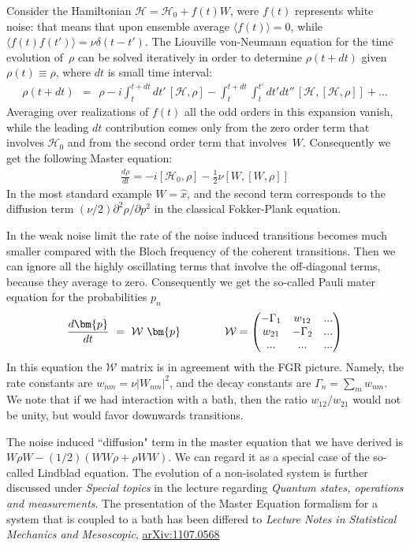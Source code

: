 \documentclass[onecolumn,fleqn]{revtex4}
\newcommand{\amatrix}[1]{\begin{matrix} #1 \end{matrix}}
\newcommand{\beq}{\begin{eqnarray}}
\newcommand{\eeq}{\end{eqnarray}}
\begin{document}
Consider the Hamiltonian ${\mathcal{H}=\mathcal{H}_0+f(t)W}$, 
were  $f(t)$ represents white noise: that means that upon 
ensemble average ${\langle f(t)\rangle=0}$, 
while ${\langle f(t)f(t') \rangle = \nu\delta(t-t')}$. 
The Liouville von-Neumann equation for the time evolution 
of~$\rho$ can be solved iteratively in order 
to determine $\rho(t+dt)$ given $\rho(t)\equiv\rho$, where $dt$ 
is small time interval:
\beq
\rho(t+dt) \ \ = \ \ \rho -i\int_t^{t+dt} dt' \, [\mathcal{H}, \rho] 
-\int_t^{t+dt} \int_t^{t'}  dt'dt''  \, [\mathcal{H}, [\mathcal{H}, \rho]] + ... 
\eeq
Averaging over realizations of $f(t)$ all the odd orders in this expansion 
vanish, while the leading $dt$ contribution comes only from the 
zero order term that involves $\mathcal{H}_0$ 
and from the second order term that involves~$W$.
Consequently we get the following Master equation:
\beq 
\frac{d\rho}{dt} = -i[\mathcal{H}_0,\rho] - \frac{1}{2}\nu[W,[W,\rho]]
\eeq
In the most standard example $W=\hat{x}$, 
and the second term corresponds to the 
diffusion term ${(\nu/2)\partial^2\rho/\partial p^2}$ 
in the classical Fokker-Plank equation.


In the weak noise limit the rate of the noise induced 
transitions becomes much smaller compared with the Bloch 
frequency of the coherent transitions. 
Then we can ignore all the highly oscillating terms 
that involve the off-diagonal terms, because they average to zero. 
Consequently we get the so-called Pauli mater equation 
for the probabilities $p_n$  
\beq 
\frac{d\bm{p}}{dt} \ = \ \mathcal{W} \ \bm{p}
\ \ \ \ \ \ \ \ \ \ \ \ 
\mathcal{W} = \left( 
\amatrix{
-\Gamma_1 & w_{12} & ... \cr
w_{21} & -\Gamma_2 & ... \cr
... & ... & ...
} 
\right)
\eeq
In this equation the $\mathcal{W}$ matrix is in agreement 
with the FGR picture. Namely, the rate constants 
are $w_{nm} = \nu |W_{nm}|^2$,  
and the decay constants are $\Gamma_n=\sum_m w_{nm}$. 
We note that if we had interaction with a bath, 
then the ratio $w_{12}/w_{21}$ would not be unity, 
but would favor downwards transitions. 


The noise induced ``diffusion" term in the master equation 
that we have derived is ${W\rho W-(1/2)(W W \rho + \rho W W)}$. 
We can regard it as a special case of the so-called Lindblad equation.
The evolution of a non-isolated system is further 
discussed under {\em Special topics} in the lecture 
regarding {\em Quantum states, operations and measurements}. 
The presentation of the Master Equation formalism for 
a system that is coupled to a bath has been differed to    
{\em Lecture Notes in Statistical Mechanics and Mesoscopic}, 
\href{http://arxiv.org/abs/1107.0568}{arXiv:1107.0568}
\end{document}

